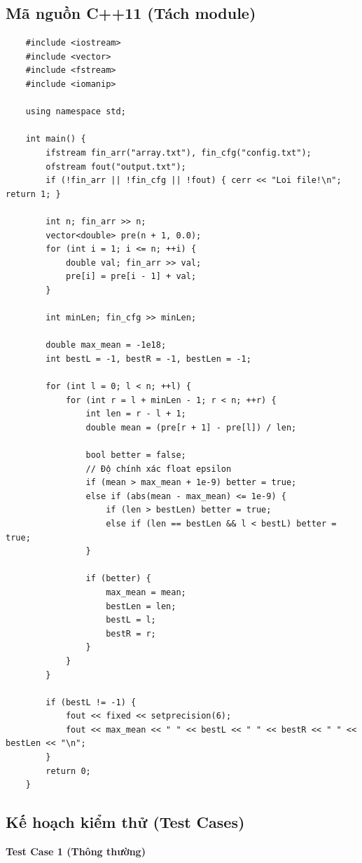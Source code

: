 \subsection{Mã nguồn C++11 (Tách module)}
    \begin{lstlisting}
    #include <iostream>
    #include <vector>
    #include <fstream>
    #include <iomanip>

    using namespace std;

    int main() {
        ifstream fin_arr("array.txt"), fin_cfg("config.txt");
        ofstream fout("output.txt");
        if (!fin_arr || !fin_cfg || !fout) { cerr << "Loi file!\n"; return 1; }

        int n; fin_arr >> n;
        vector<double> pre(n + 1, 0.0);
        for (int i = 1; i <= n; ++i) {
            double val; fin_arr >> val;
            pre[i] = pre[i - 1] + val;
        }

        int minLen; fin_cfg >> minLen;

        double max_mean = -1e18;
        int bestL = -1, bestR = -1, bestLen = -1;

        for (int l = 0; l < n; ++l) {
            for (int r = l + minLen - 1; r < n; ++r) {
                int len = r - l + 1;
                double mean = (pre[r + 1] - pre[l]) / len;
                
                bool better = false;
                // Độ chính xác float epsilon
                if (mean > max_mean + 1e-9) better = true;
                else if (abs(mean - max_mean) <= 1e-9) {
                    if (len > bestLen) better = true;
                    else if (len == bestLen && l < bestL) better = true;
                }

                if (better) {
                    max_mean = mean;
                    bestLen = len;
                    bestL = l;
                    bestR = r;
                }
            }
        }

        if (bestL != -1) {
            fout << fixed << setprecision(6);
            fout << max_mean << " " << bestL << " " << bestR << " " << bestLen << "\n";
        }
        return 0;
    }
\end{lstlisting}

\subsection{Kế hoạch kiểm thử (Test Cases)}

    \textbf{Test Case 1 (Thông thường)}

